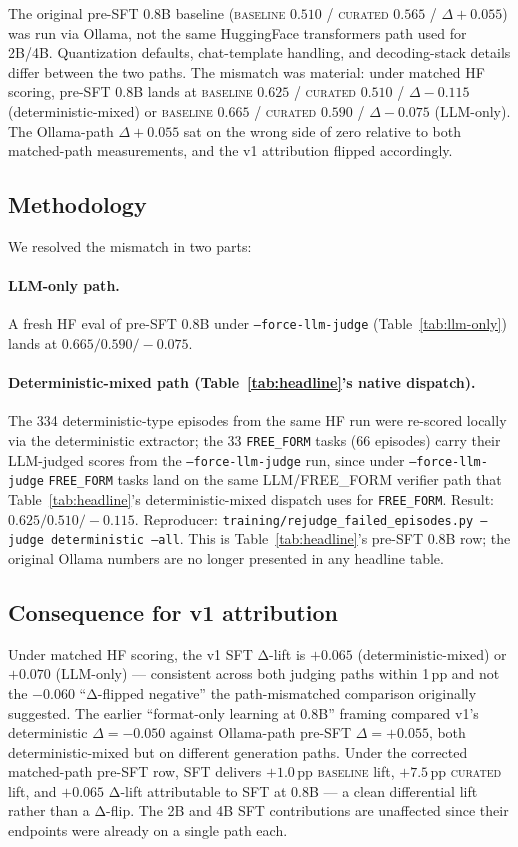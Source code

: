 \documentclass[10pt]{article}
\newcommand{\BL}{\textsc{baseline}\xspace}
\newcommand{\CU}{\textsc{curated}\xspace}
\begin{document}
The original pre-SFT 0.8B baseline (\BL{} $0.510$ / \CU{} $0.565$ / $\Delta +0.055$) was run via Ollama, not the same HuggingFace transformers path used for 2B/4B. Quantization defaults, chat-template handling, and decoding-stack details differ between the two paths. The mismatch was material: under matched HF scoring, pre-SFT 0.8B lands at \BL{} $0.625$ / \CU{} $0.510$ / $\Delta -0.115$ (deterministic-mixed) or \BL{} $0.665$ / \CU{} $0.590$ / $\Delta -0.075$ (LLM-only). The Ollama-path $\Delta +0.055$ sat on the wrong side of zero relative to both matched-path measurements, and the v1 attribution flipped accordingly.

\subsection{Methodology}
We resolved the mismatch in two parts:

\paragraph{LLM-only path.} A fresh HF eval of pre-SFT 0.8B under \texttt{--force-llm-judge} (Table~\ref{tab:llm-only}) lands at $0.665 / 0.590 / -0.075$.

\paragraph{Deterministic-mixed path (Table~\ref{tab:headline}'s native dispatch).} The 334 deterministic-type episodes from the same HF run were re-scored locally via the deterministic extractor; the 33 \texttt{FREE\_FORM} tasks (66 episodes) carry their LLM-judged scores from the \texttt{--force-llm-judge} run, since under \texttt{--force-llm-judge} \texttt{FREE\_FORM} tasks land on the same LLM/FREE\_FORM verifier path that Table~\ref{tab:headline}'s deterministic-mixed dispatch uses for \texttt{FREE\_FORM}. Result: $0.625 / 0.510 / -0.115$. Reproducer: \texttt{training/rejudge\_failed\_episodes.py --judge deterministic --all}. This is Table~\ref{tab:headline}'s pre-SFT 0.8B row; the original Ollama numbers are no longer presented in any headline table.

\subsection{Consequence for v1 attribution}
Under matched HF scoring, the v1 SFT Δ-lift is $+0.065$ (deterministic-mixed) or $+0.070$ (LLM-only) --- consistent across both judging paths within 1\,pp and not the $-0.060$ ``Δ-flipped negative'' the path-mismatched comparison originally suggested. The earlier ``format-only learning at 0.8B'' framing compared v1's deterministic $\Delta = -0.050$ against Ollama-path pre-SFT $\Delta = +0.055$, both deterministic-mixed but on different generation paths. Under the corrected matched-path pre-SFT row, SFT delivers $+1.0$\,pp \BL{} lift, $+7.5$\,pp \CU{} lift, and $+0.065$ Δ-lift attributable to SFT at 0.8B --- a clean differential lift rather than a Δ-flip. The 2B and 4B SFT contributions are unaffected since their endpoints were already on a single path each.
\end{document}
